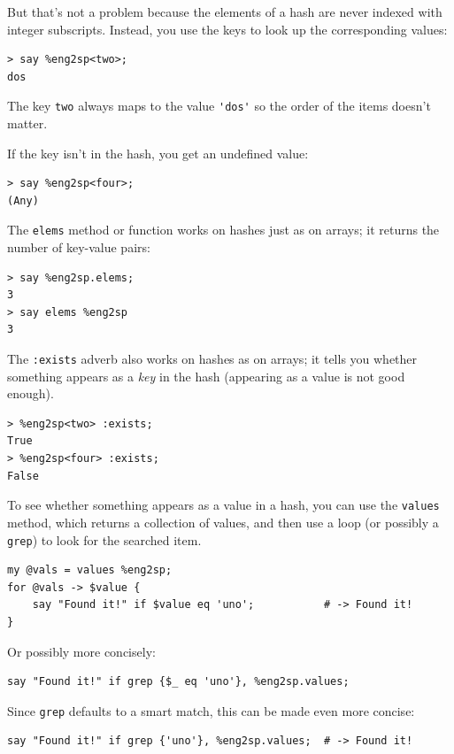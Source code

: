 But that's not a problem because the elements of a hash 
are never indexed with integer subscripts. Instead, you use 
the keys to look up the corresponding values:

\begin{verbatim}
> say %eng2sp<two>;
dos
\end{verbatim}
%
The key \verb"two" always maps to the value \verb"'dos'" 
so the order of the items doesn't matter.

If the key isn't in the hash, you get an undefined value:

\begin{verbatim}
> say %eng2sp<four>;
(Any)
\end{verbatim}
%
The {\tt elems} method or function works on hashes just 
as on arrays; it returns the number of key-value pairs:


\begin{verbatim}
> say %eng2sp.elems;
3
> say elems %eng2sp
3
\end{verbatim}
%
The {\tt :exists} adverb also works on hashes as on 
arrays; it tells you whether
something appears as a {\em key} in the hash (appearing
as a value is not good enough).

\begin{verbatim}
> %eng2sp<two> :exists;
True
> %eng2sp<four> :exists;
False
\end{verbatim}
%
To see whether something appears as a value in a hash, you
can use the {\tt values} method, which returns a collection of
values, and then use a loop (or possibly a {\tt grep}) to 
look for the searched item.

\begin{verbatim}
my @vals = values %eng2sp;
for @vals -> $value {
    say "Found it!" if $value eq 'uno';           # -> Found it!
}
\end{verbatim}
%
Or possibly more concisely:
\begin{verbatim}
say "Found it!" if grep {$_ eq 'uno'}, %eng2sp.values;
\end{verbatim}

Since {\tt grep} defaults to a smart match, this can be 
made even more concise:

\begin{verbatim}
say "Found it!" if grep {'uno'}, %eng2sp.values;  # -> Found it!
\end{verbatim}

